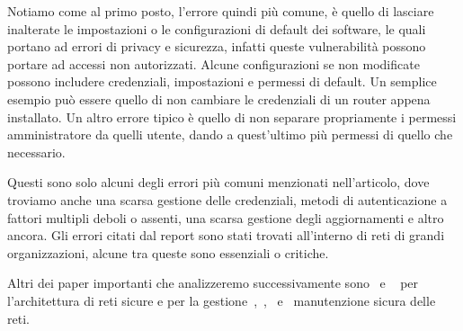         \vspace{3mm}
        
        Notiamo come al primo posto, l'errore quindi più comune, è quello di lasciare
        inalterate le impostazioni o le configurazioni di default dei software, le quali portano ad errori di privacy e sicurezza, infatti queste vulnerabilità possono portare ad accessi non autorizzati. 
        Alcune configurazioni se non modificate possono includere credenziali, impostazioni e permessi di default. Un semplice esempio può essere quello di non cambiare le credenziali di un router appena installato.
        Un altro errore tipico è quello di non separare propriamente i permessi amministratore da quelli utente, dando a quest'ultimo più permessi di quello
        che necessario. 
        
        \vspace{3mm}

        Questi sono solo alcuni degli errori più comuni menzionati
        nell'articolo, dove troviamo anche una scarsa gestione delle credenziali, metodi di autenticazione a fattori multipli deboli o assenti, una scarsa gestione degli aggiornamenti e altro ancora. Gli errori citati dal report sono stati trovati all'interno di reti di grandi organizzazioni, alcune tra queste sono essenziali o critiche.

        Altri dei paper importanti che analizzeremo successivamente sono~\cite{Design_Principles_Secure_Systems} e ~\cite{Advanced_Networking_Cybersecurity_Approaches} per l'architettura di reti sicure e per la gestione~\cite{Comparison_CSF_ISO},~\cite{nist_patch_management},~\cite{access_control} e~\cite{patch_man_framework} manutenzione sicura delle reti.

                
